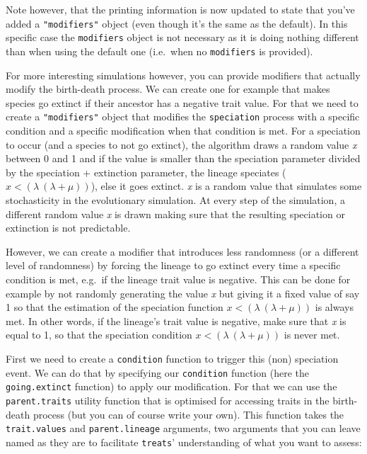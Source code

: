 \documentclass[
]{book}
\begin{document}
Note however, that the printing information is now updated to state that you've added a \texttt{"modifiers"} object (even though it's the same as the default).
In this specific case the \texttt{modifiers} object is not necessary as it is doing nothing different than when using the default one (i.e.~when no \texttt{modifiers} is provided).

For more interesting simulations however, you can provide modifiers that actually modify the birth-death process.
We can create one for example that makes species go extinct if their ancestor has a negative trait value.
For that we need to create a \texttt{"modifiers"} object that modifies the \texttt{speciation} process with a specific condition and a specific modification when that condition is met.
For a speciation to occur (and a species to not go extinct), the algorithm draws a random value \emph{x} between 0 and 1 and if the value is smaller than the speciation parameter divided by the speciation + extinction parameter, the lineage speciates (\(x < (\lambda \ (\lambda + \mu))\)), else it goes extinct.
\emph{x} is a random value that simulates some stochasticity in the evolutionary simulation.
At every step of the simulation, a different random value \emph{x} is drawn making sure that the resulting speciation or extinction is not predictable.

However, we can create a modifier that introduces less randomness (or a different level of randomness) by forcing the lineage to go extinct every time a specific condition is met, e.g.~if the lineage trait value is negative.
This can be done for example by not randomly generating the value \emph{x} but giving it a fixed value of say 1 so that the estimation of the speciation function \(x < (\lambda \ (\lambda + \mu))\) is always met.
In other words, if the lineage's trait value is negative, make sure that \emph{x} is equal to 1, so that the speciation condition \(x < (\lambda \ (\lambda + \mu))\) is never met.

First we need to create a \texttt{condition} function to trigger this (non) speciation event.
We can do that by specifying our \texttt{condition} function (here the \texttt{going.extinct} function) to apply our modification.
For that we can use the \texttt{parent.traits} utility function that is optimised for accessing traits in the birth-death process (but you can of course write your own).
This function takes the \texttt{trait.values} and \texttt{parent.lineage} arguments, two arguments that you can leave named as they are to facilitate \texttt{treats}' understanding of what you want to assess:
\end{document}
